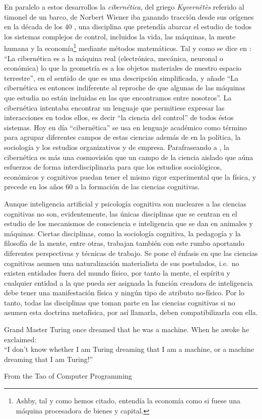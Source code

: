 \documentclass[12pt]{memoir}
\begin{document}
\begin{appendices}
En paralelo a estos desarrollos la \textit{cibernética}, del griego \textit{Kyvernêtès} referido al timonel de un barco, de Norbert Wiener iba ganando tracción desde sus orígenes en la década de los 40 \parencite[p.142-143]{theCognitiveRevolution}, una disciplina que pretendía abarcar el estudio de todos los sistemas complejos de control, incluidos la vida, las máquinas, la mente humana y la economía\footnote{Ashby, tal y como hemos citado, entendía la economía como si fuese una máquina procesadora de bienes y capital.} mediante métodos matemáticos. Tal y como se dice en \parencite[p.12]{ciberneticsAshby}: ``La cibernética es a la máquina real (electrónica, mecánica, neuronal o económica) lo que la geometría es a los objetos materiales de nuestro espacio terrestre'', en el sentido de que es una descripción simplificada, y añade ``La cibernética es entonces indiferente al reproche de que algunas de las máquinas que estudia no están incluidas en las que encontramos entre nosotros''. La cibernética intentaba encontrar un lenguaje que permitiese expresar las interacciones en todos ellos, es decir ``la ciencia del control'' de todos éstos sistemas. Hoy en día ``cibernética'' se usa en lenguaje académico como término para agrupar diferentes campos de estas ciencias además de en la política, la sociología y los estudios organizativos y de empresa. Parafraseando a \parencite[p.103-104 y p.207-216]{pylyshyn70}, la cibernética es más una cosmovisión que un campo de la ciencia aislado que aúna esfuerzos de forma interdisciplinaria para que los estudios sociológicos, económicos y cognitivos puedan tener el mismo rigor experimental que la física, y precede en los años 60 a la formación de las ciencias cognitivas.

Aunque inteligencia artificial y psicología cognitiva son nucleares a las ciencias cognitivas no son, evidentemente, las únicas disciplinas que se centran en el estudio de los mecanismos de consciencia e inteligencia que se dan en animales y máquinas. Ciertas disciplinas, como la sociología cognitiva, la pedagogía y la filosofía de la mente, entre otras, trabajan también con este rumbo aportando diferentes perspectivas y técnicas de trabajo. Se pone el énfasis en que las ciencias cognitivas asumen una naturalización materialista de sus postulados, i.e.\ no existen entidades fuera del mundo físico, por tanto la mente, el espíritu y cualquier entidad a la que pueda ser asignada la función creadora de inteligencia debe tener una manifestación física y ningún tipo de atributo no-físico. Por lo tanto, todas las disciplinas que toman parte en las ciencias cognitivas si no asumen esta doctrina metafísica, por así llamarla, deben compatibilizarla con ella.
\end{appendices}



\newpage

\printbibliography

\newpage
\epigraph{Grand Master Turing once dreamed that he was a machine. When he awoke he exclaimed: \\

“I don't know whether I am Turing dreaming that I am a machine, or a machine dreaming that I am Turing!”}{From the Tao of Computer Programming}
\end{document}
